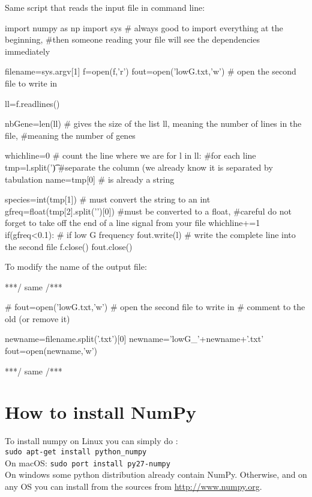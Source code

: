 \documentclass[article,10pt]{scrartcl}
\begin{document}
Same script that reads the input file in command line:
\begin{python}
import numpy as np
import sys # always good to import everything at the beginning, 
#then someone reading your file will see the dependencies immediately

filename=sys.argv[1]
f=open(f,'r')
fout=open('lowG.txt,'w') # open the second file to write in

ll=f.readlines()

nbGene=len(ll) # gives the size of the list ll, meaning the number of lines in the file, 
#meaning the number of genes

whichline=0 # count the line where we are
for l in ll: #for each line
   tmp=l.split('\t) #separate the column (we already know it is separated by tabulation
   name=tmp[0] # is already a string
   
   species=int(tmp[1]) # must convert the string to an int
   gfreq=float(tmp[2].split('\n')[0])  #must be converted to a float, 
   #careful do not forget to take off the end of a line signal from your file
   whichline+=1
   if(gfreq<0.1): # if low G frequency
      fout.write(l) # write the complete line into the second file
f.close()
fout.close()
\end{python}
To modify the name of the output file:
\begin{python}

***/ same /***

# fout=open('lowG.txt,'w') # open the second file to write in
# comment to the old (or remove it)

newname=filename.split('.txt')[0]
newname='lowG_'+newname+'.txt'
fout=open(newname,'w')

***/ same /***
\end{python}

\section*{How to install NumPy}
To install numpy on Linux you can simply do :\\
\texttt{sudo apt-get install python\_numpy}\\
On macOS:
\texttt{sudo port install py27-numpy}\\
On windows some python distribution already contain NumPy. Otherwise, and on any OS you can install from the sources from \url{http://www.numpy.org}.
\end{document}
